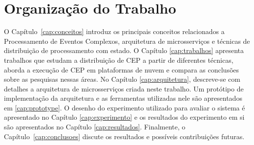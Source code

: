 

\newpage
\section{Organização do Trabalho}
\label{sec:organizacao_trabalho}


O Capítulo~\ref{cap:conceitos} introduz os principais conceitos relacionados a Processamento de Eventos Complexos, arquitetura de microsserviços e técnicas de distribuição de processamento com estado. O Capítulo \ref{cap:trabalhos} apresenta trabalhos que estudam a distribuição de CEP a partir de diferentes técnicas, aborda a execução de CEP em plataformas de nuvem e compara as conclusões sobre as pesquisas nessas áreas. No Capítulo \ref{cap:arquitetura}, descreve-se com detalhes a arquitetura de microsserviços criada neste trabalho. Um protótipo de implementação da arquitetura e as ferramentas utilizadas nele  são apresentados em \ref{cap:prototype}. O desenho do experimento utilizado para avaliar o sistema é apresentado no Capítulo \ref{cap:experimento} e os resultados do experimento em si são apresentados no Capítulo \ref{cap:resultados}. Finalmente, o Capítulo~\ref{cap:conclusoes} discute os resultados e  possíveis contribuições futuras.

